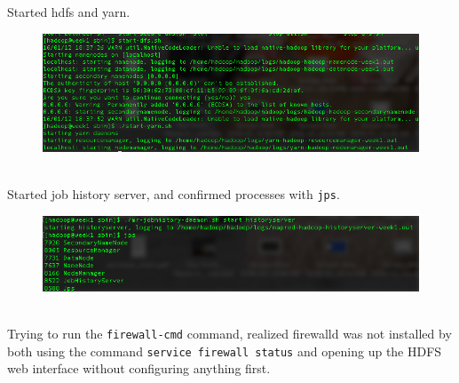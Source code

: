 \documentclass[10pt]{article}
\begin{document}
\hfill
{}%
\par
Started hdfs and yarn.
\pagebreak
\begin{figure}[!h]
\includegraphics[scale=0.37]{hdfs_yarn.png}
\centering
\end{figure}\\
Started job history server, and confirmed processes with \verb|jps|.
\begin{figure}[!h]
\includegraphics[scale=0.37]{jobhistory.png}
\centering
\end{figure}\\
Trying to run the \verb|firewall-cmd| command, realized firewalld was not installed by both using the command \verb|service firewall status| and opening up the HDFS web interface without configuring anything first.
\par
{}%
\hfill
{}%
\end{document}
